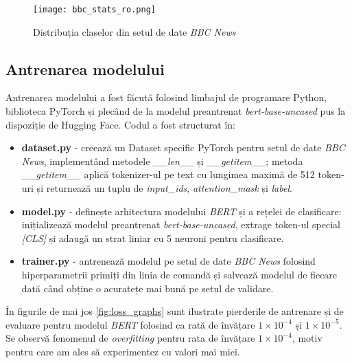\vspace{1em}

\begin{figure}[h]
    \centering
    \texttt{[image: bbc\_stats\_ro.png]}
    \caption{Distribuția claselor din setul de date \textit{BBC News}}
    \label{fig:bbc-stats}
\end{figure}

\vspace{-0.5em}
\subsection{Antrenarea modelului}
\vspace{1em}
Antrenarea modelului a fost făcută folosind limbajul de programare Python, biblioteca PyTorch \cite{paszke2019pytorch}
și plecând de la modelul preantrenat \textit{bert-base-uncased} pus la dispoziție de Hugging Face.
Codul a fost structurat în: 
\vspace{1em}

\begin{itemize}
    \item \textbf{dataset.py} - creează un Dataset specific PyTorch pentru setul de date \textit{BBC News},
    implementând metodele \textit{\_\_len\_\_} și \textit{\_\_getitem\_\_}; metoda \textit{\_\_getitem\_\_}
    aplică tokenizer-ul pe text cu lungimea maximă de 512 token-uri și returnează un tuplu de \textit{input\_ids},
    \textit{attention\_mask} și \textit{label}.
    \item \textbf{model.py} - definește arhitectura modelului \textit{BERT} și a rețelei de clasificare:
    inițializează modelul preantrenat \textit{bert-base-uncased}, extrage token-ul special \textit{[CLS]}
    și adaugă un strat liniar cu 5 neuroni pentru clasificare.
    \item \textbf{trainer.py} - antrenează modelul pe setul de date \textit{BBC News} folosind
    hiperparametrii primiți din linia de comandă și salvează modelul de fiecare dată când obține o
    acuratețe mai bună pe setul de validare.
\end{itemize}


\par
În figurile de mai jos \ref{fig:loss_graphs} sunt ilustrate pierderile de antrenare și de evaluare pentru modelul \textit{BERT}
folosind ca rată de învățare $1 \times 10^{-4}$ și $1 \times 10^{-5}$. Se observă fenomenul de \textit{overfitting}
pentru rata de învățare $1 \times 10^{-4}$, motiv pentru care am ales să experimentez cu valori mai mici.

